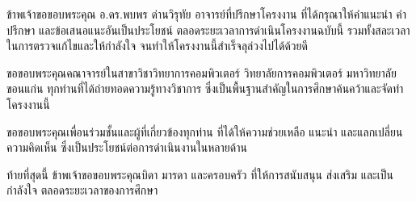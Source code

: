 %

ข้าพเจ้าขอขอบพระคุณ อ.ดร.พบพร ด่านวิรุทัย อาจารย์ที่ปรึกษาโครงงาน
ที่ได้กรุณาให้คำแนะนำ คำปรึกษา และข้อเสนอแนะอันเป็นประโยชน์
ตลอดระยะเวลาการดำเนินโครงงานฉบับนี้
รวมทั้งสละเวลาในการตรวจแก้ไขและให้กำลังใจ
จนทำให้โครงงานนี้สำเร็จลุล่วงไปได้ด้วยดี

ขอขอบพระคุณคณาจารย์ในสาขาวิชาวิทยาการคอมพิวเตอร์
วิทยาลัยการคอมพิวเตอร์ มหาวิทยาลัยขอนแก่น
ทุกท่านที่ได้ถ่ายทอดความรู้ทางวิชาการ
ซึ่งเป็นพื้นฐานสำคัญในการศึกษาค้นคว้าและจัดทำโครงงานนี้

ขอขอบพระคุณเพื่อนร่วมชั้นและผู้ที่เกี่ยวข้องทุกท่าน
ที่ได้ให้ความช่วยเหลือ แนะนำ และแลกเปลี่ยนความคิดเห็น
ซึ่งเป็นประโยชน์ต่อการดำเนินงานในหลายด้าน

ท้ายที่สุดนี้ ข้าพเจ้าขอขอบพระคุณบิดา มารดา และครอบครัว
ที่ให้การสนับสนุน ส่งเสริม และเป็นกำลังใจ
ตลอดระยะเวลาของการศึกษา
